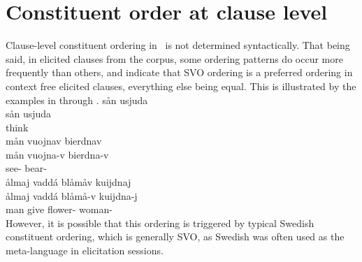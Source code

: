 \section{Constituent order at clause level}\label{constituentOrderClauses}
Clause-level constituent ordering in \PS\ is not determined syntactically. 
That being said, in elicited clauses from the corpus, some ordering patterns do occur more frequently than others, and indicate that SVO ordering is a preferred ordering in context free elicited clauses, everything else being equal. 
This is illustrated by the examples in  through . 
\ea\label{standardConstOrder1}%
\glll	sån usjuda\\
	sån usjuda\\
	 think\BS{} \\\nopagebreak
{} 
\z
\ea\label{standardConstOrder2}%
\glll	mån vuojnav bierdnav\\
	mån vuojna-v bierdna-v\\
	 see- bear- \\\nopagebreak
{} 
\z
\ea\label{standardConstOrder3}%
\glll	ålmaj vaddá blåmåv kuijdnaj\\
	ålmaj vaddá blåmå-v kuijdna-j\\
	man\BS{} give\BS{} flower- woman-\\\nopagebreak
{} 
\z
However, it is possible that this ordering is triggered by typical Swedish constituent ordering, which is generally SVO, as Swedish was often used as the meta-language in elicitation sessions. 

